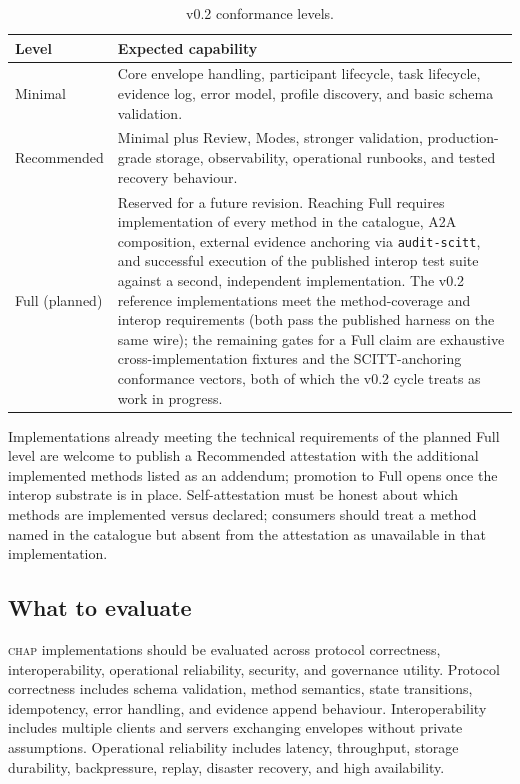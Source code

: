 \documentclass[11pt]{article}
\newcommand{\chap}{\textsc{chap}}
\begin{document}
\begin{table}[h]
\centering
\caption{v0.2 conformance levels.}
\label{tab:conformance}
\begin{tabularx}{\textwidth}{@{}p{2.7cm}X@{}}
\toprule
\textbf{Level} & \textbf{Expected capability} \\
\midrule
Minimal & Core envelope handling, participant lifecycle, task lifecycle, evidence log, error model, profile discovery, and basic schema validation. \\
Recommended & Minimal plus Review, Modes, stronger validation, production-grade storage, observability, operational runbooks, and tested recovery behaviour. \\
Full (planned) & Reserved for a future revision. Reaching Full requires implementation of every method in the catalogue, A2A composition, external evidence anchoring via \texttt{audit-scitt}, and successful execution of the published interop test suite against a second, independent implementation. The v0.2 reference implementations meet the method-coverage and interop requirements (both pass the published harness on the same wire); the remaining gates for a Full claim are exhaustive cross-implementation fixtures and the SCITT-anchoring conformance vectors, both of which the v0.2 cycle treats as work in progress. \\
\bottomrule
\end{tabularx}
\end{table}

Implementations already meeting the technical requirements of the planned Full level are welcome to publish a Recommended attestation with the additional implemented methods listed as an addendum; promotion to Full opens once the interop substrate is in place. Self-attestation must be honest about which methods are implemented versus declared; consumers should treat a method named in the catalogue but absent from the attestation as unavailable in that implementation.

\subsection{What to evaluate}

\chap{} implementations should be evaluated across protocol correctness, interoperability, operational reliability, security, and governance utility. Protocol correctness includes schema validation, method semantics, state transitions, idempotency, error handling, and evidence append behaviour. Interoperability includes multiple clients and servers exchanging envelopes without private assumptions. Operational reliability includes latency, throughput, storage durability, backpressure, replay, disaster recovery, and high availability.
\end{document}
